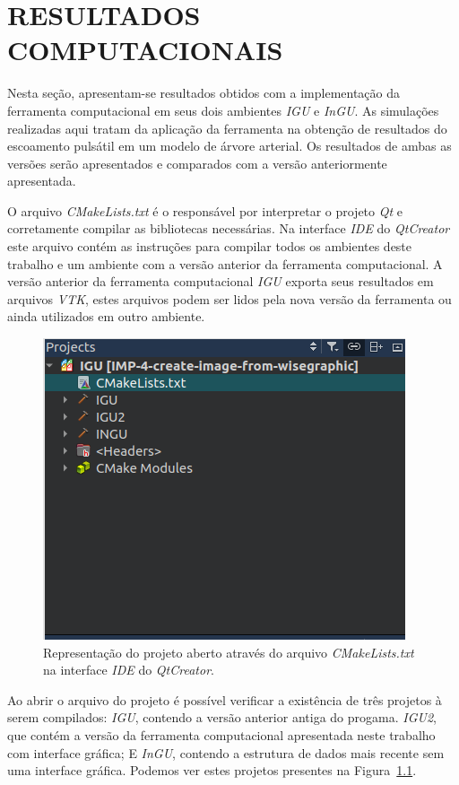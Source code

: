 \chapter{RESULTADOS COMPUTACIONAIS}\label{sec:resultados2}

Nesta seção, apresentam-se resultados obtidos com a implementação da ferramenta computacional em seus dois ambientes \textit{IGU} e \textit{InGU}. As simulações realizadas aqui tratam da aplicação da ferramenta na obtenção de resultados do escoamento pulsátil em um modelo de árvore arterial. Os resultados de ambas as versões serão apresentados e comparados com a versão anteriormente apresentada.

O arquivo \textit{CMakeLists.txt} é o responsável por interpretar o projeto \textit{Qt} e corretamente compilar as bibliotecas necessárias. Na interface \textit{IDE} do \textit{QtCreator} este arquivo contém as instruções para compilar todos os ambientes deste trabalho e um ambiente com a versão anterior da ferramenta computacional. A versão anterior da ferramenta computacional \textit{IGU} exporta seus resultados em arquivos \textit{VTK}, estes arquivos podem ser lidos pela nova versão da ferramenta ou ainda utilizados em outro ambiente.


\begin{figure}[!htbp]
	\centering
	\includegraphics[scale=1.5]{Figures/cmake_print.png}
	\caption{Representação do projeto aberto através do arquivo \textit{CMakeLists.txt} na interface \textit{IDE} do \textit{QtCreator}.}
	\label{fig:cmake}
\end{figure}


Ao abrir o arquivo do projeto é possível verificar a existência de três projetos à serem compilados: \textit{IGU}, contendo a versão anterior antiga do progama. \textit{IGU2}, que contém a versão da ferramenta computacional apresentada neste trabalho com interface gráfica; E \textit{InGU}, contendo a estrutura de dados mais recente sem uma interface gráfica. Podemos ver estes projetos presentes na Figura~\ref{fig:cmake}.

